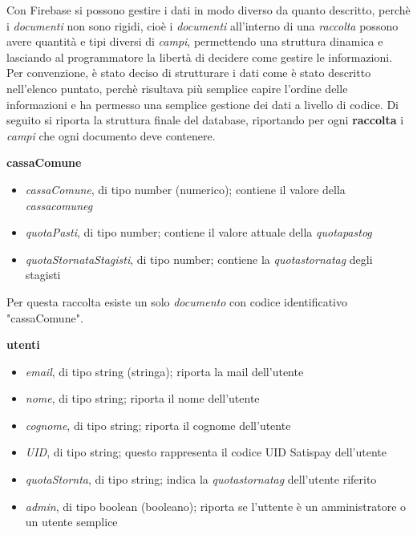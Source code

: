 Con Firebase si possono gestire i dati in modo diverso da quanto descritto, perchè i \emph{documenti} non sono rigidi, cioè i \emph{documenti} all'interno di una \emph{raccolta} possono avere quantità e tipi diversi di \emph{campi}, permettendo una struttura dinamica e lasciando al programmatore la libertà di decidere come gestire le informazioni.\newline
\newline
Per convenzione, è stato deciso di strutturare i dati come è stato descritto nell'elenco puntato, perchè risultava più semplice capire l'ordine delle informazioni e ha permesso una semplice gestione dei dati a livello di codice.\newline
Di seguito si riporta la struttura finale del database, riportando per ogni \textbf{raccolta} i \emph{campi} che ogni documento deve contenere.\newline

\newpage

\noindent \textbf{cassaComune}
\begin{itemize}
    \item \emph{cassaComune}, di tipo number (numerico); contiene il valore della \emph{\gls{cassacomuneg}}
    \item \emph{quotaPasti}, di tipo number; contiene il valore attuale della \emph{\gls{quotapastog}}
    \item \emph{quotaStornataStagisti}, di tipo number; contiene la \emph{\gls{quotastornatag}} degli stagisti
\end{itemize}
Per questa raccolta esiste un solo \emph{documento} con codice identificativo "cassaComune".\newline

\noindent \textbf{utenti}
\begin{itemize}
    \item \emph{email}, di tipo string (stringa); riporta la mail dell'utente
    \item \emph{nome}, di tipo string; riporta il nome dell'utente
    \item \emph{cognome}, di tipo string; riporta il cognome dell'utente
    \item \emph{UID}, di tipo string; questo rappresenta il codice UID Satispay dell'utente
    \item \emph{quotaStornta}, di tipo string; indica la \emph{\gls{quotastornatag}} dell'utente riferito
    \item \emph{admin}, di tipo boolean (booleano); riporta se l'uttente è un amministratore o un utente semplice
\end{itemize}

